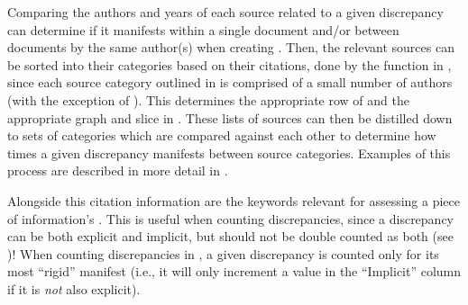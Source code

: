 Comparing the authors and years of each source related to a given discrepancy
can determine if it manifests within a single document and/or between documents
by the same author(s) when creating . Then, the
relevant sources can be sorted into their categories based on their citations,
done by the function in , since each source category
outlined in  is comprised of a small number of authors (with the
exception of ).
This determines the appropriate row of  and the appropriate
graph and slice in . These lists of sources can then
be distilled down to sets of categories which are compared against
each other to determine how times a given discrepancy manifests between source
categories. Examples of this process are described in more detail in
.

\label{auto-discrep-analysis-rigidity}
Alongside this citation information are the keywords relevant for assessing a
piece of information's . This is useful when counting
discrepancies, since a discrepancy can be both explicit and implicit, but
should not be double counted as both (see )! When counting
discrepancies in , a given discrepancy is counted only for
its most ``rigid'' manifest (i.e., it will only increment a value in the
``Implicit'' column if it is \emph{not} also explicit).

